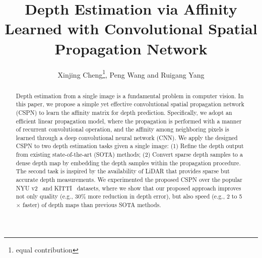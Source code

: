 \documentclass[runningheads]{llncs}
\makeatletter
\newcommand{\printfnsymbol}[1]{%
  \textsuperscript{\@fnsymbol{#1}}%
}
\makeatother
\begin{document}
\pagestyle{headings}
\mainmatter

\title{Depth Estimation via Affinity Learned with Convolutional Spatial Propagation Network} 



\author{Xinjing Cheng\thanks{equal contribution}, Peng Wang\printfnsymbol{1} and Ruigang Yang}




\maketitle

\begin{abstract}
Depth estimation from a single image is a fundamental problem in computer vision. In this paper, we propose a simple yet effective convolutional spatial propagation network (CSPN) to learn the affinity matrix for depth prediction. 
Specifically, we adopt an efficient linear propagation model, where the propagation is performed with a manner of recurrent convolutional operation, and the affinity among neighboring pixels is learned through a deep convolutional neural network (CNN). 
We apply the designed CSPN to two depth estimation tasks given a single image:  (1) Refine the depth output from existing state-of-the-art (SOTA)  methods;  (2) Convert sparse depth samples to a dense depth map by embedding the depth samples within the propagation procedure. The second task is inspired by the availability of LiDAR that provides sparse but accurate depth measurements. We experimented the proposed CSPN over the popular NYU v2~\cite{silberman2012indoor} and KITTI~\cite{geiger2012we} datasets, where we show that our proposed approach improves  not only quality (e.g., 30\% more reduction in depth error), but also speed (e.g., 2 to 5$\times$ faster) of depth maps than previous SOTA methods. %
\end{abstract}







\clearpage



\end{document}
